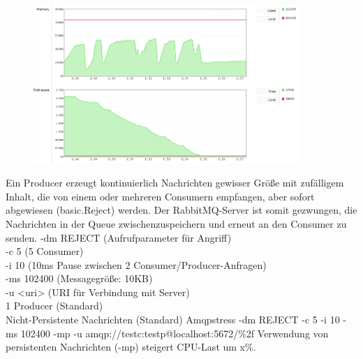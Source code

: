 \documentclass[	a4paper,
			11pt,
			titlepage,
			oneside,
			fleqn,
			listof=totoc,
			parskip,
			chapterprefix=false,
			numbers=noenddot]{scrartcl}
\begin{document}
		\begin{figure}[!htb]
			\centering
			\includegraphics[width=0.9\textwidth]{img/noResp/history_RAM_HDD.png}
		\end{figure}
	
\clearpage	
		{Ein Producer erzeugt kontinuierlich Nachrichten gewisser Größe mit zufälligem Inhalt, die von einem oder mehreren Consumern empfangen, aber sofort abgewiesen (basic.Reject) werden.%
		 Der RabbitMQ-Server ist somit gezwungen, die Nachrichten in der Queue zwischenzuspeichern und erneut an den Consumer zu senden.}%
		{%
		 -dm REJECT (Aufrufparameter für Angriff) \\
		 -c 5 (5 Consumer) \\
		 -i 10 (10ms Pause zwischen 2 Consumer/Producer-Anfragen) \\
		 -ms 102400 (Messagegröße: 10KB) \\
		 -u <uri> (URI für Verbindung mit Server) \\
		 1 Producer (Standard) \\
		 Nicht-Persistente Nachrichten (Standard)
		}%
		{Amqpstress -dm REJECT -c 5 -i 10 -ms 102400 -mp -u amqp://testc:testp@localhost:5672/\%2f}%
		{}%
		{Verwendung von persistenten Nachrichten (-mp) steigert CPU-Last um x\%.}
	
\end{document}
